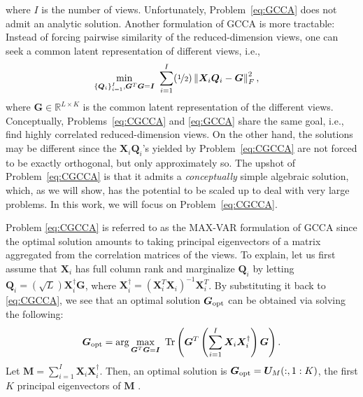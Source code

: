 \documentclass[10pt,journal]{IEEEtran}
\newcommand{\reminder}[1]{ \color{blue} [[[ \marginpar{\mbox{\color{blue} ${\bf <==}$ \color{black}}} #1 ]]] \color{black}}
\begin{document}
where $I$ is the number of views.
Unfortunately, Problem~\eqref{eq:GCCA} does not admit an analytic solution.
Another formulation of GCCA is more tractable: Instead of forcing pairwise similarity of the reduced-dimension views,
one can seek a common latent representation of different views, i.e., \cite{carroll1968generalization,rastogimultiview,arora2014multi,van2006generalized,kettenring1971canonical}
\begin{equation}\label{eq:CGCCA}
\begin{aligned}
\min_{\{{\bm Q}_i\}_{i=1}^I,{\bm G}^T{\bm G}={\bm I}} &~\sum_{i=1}^{I}(\nicefrac{1}{2})\left\|{\bm X}_i{\bm Q}_i-{\bm G}\right\|_F^2,
\end{aligned}
\end{equation}
where ${\bm G}\in\mathbb{R}^{L\times K}$ is the common latent representation of the different views.
Conceptually, Problems~\eqref{eq:CGCCA} and \eqref{eq:GCCA} share the same goal, i.e., find highly correlated reduced-dimension views. On the other hand, the solutions may be different since the ${\bm X}_i {\bm Q}_i$'s yielded by Problem~\eqref{eq:CGCCA} are not forced to be exactly orthogonal, but only approximately so.
The upshot of Problem~\eqref{eq:CGCCA} is that it admits a {\em conceptually} simple algebraic solution, which, as we will show, has the potential to be scaled up to deal with very large problems. %
In this work, we will focus on Problem~\eqref{eq:CGCCA}.

Problem \eqref{eq:CGCCA} is referred to as the MAX-VAR formulation of GCCA since the optimal solution amounts to taking principal eigenvectors of a matrix aggregated from the correlation matrices of the views.
To explain, let us first assume that ${\bm X}_i$ has full column rank
and marginalize ${\bm Q}_i$ by letting
${\bm Q}_i=(\sqrt{L}){\bm X}_i^\dag{\bm G}$, where ${\bm X}_i^\dag=({\bm X}_i^T{\bm X}_i)^{-1}{\bm X}_i^T$. By substituting it back to \eqref{eq:CGCCA}, we see that an optimal solution ${\bm G}_{\rm opt}$ can be obtained via solving the following:
\begin{equation}
\begin{aligned}
{\bm G}_{\rm opt} = \arg\max_{{\bm G}^T{\bm G} = {\bm I}} ~ {\rm Tr}\left({\bm G}^T\left(\sum_{i=1}^I {\bm X}_i{\bm X}_i^\dag\right){\bm G}\right). \label{eq:new_obj}
\end{aligned}
\end{equation}
Let ${\bm M} = \sum_{i=1}^I {\bm X}_i{\bm X}_i^\dag$.
Then, an optimal solution is ${\bm G}_{\rm opt}={\bm U}_M(:,1:K)$, 
the first $K$ principal eigenvectors of ${\bm M}$ \cite{GHGolub1996}.
\end{document}
